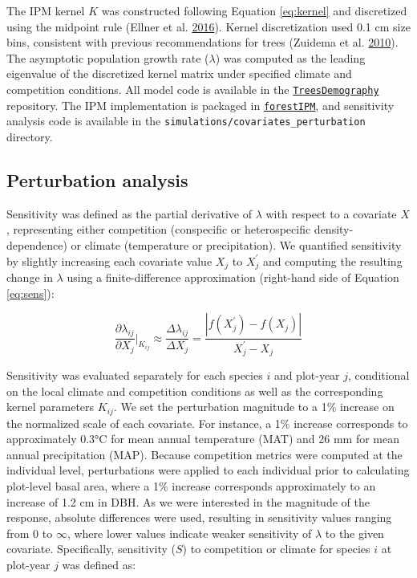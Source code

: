 \documentclass[12pt]{article}
\begin{document}
The IPM kernel \(K\) was constructed following Equation \ref{eq:kernel}
and discretized using the midpoint rule (Ellner et al.
\protect\hyperlink{ref-Ellner2016}{2016}). Kernel discretization used
0.1 cm size bins, consistent with previous recommendations for trees
(Zuidema et al. \protect\hyperlink{ref-zuidema2010integral}{2010}). The
asymptotic population growth rate (\(\lambda\)) was computed as the
leading eigenvalue of the discretized kernel matrix under specified
climate and competition conditions. All model code is available in the
\href{https://github.com/willvieira/TreesDemography}{\texttt{TreesDemography}}
repository. The IPM implementation is packaged in
\href{https://github.com/willvieira/forestIPM}{\texttt{forestIPM}}, and
sensitivity analysis code is available in the
\texttt{simulations/covariates\_perturbation} directory.

\hypertarget{perturbation-analysis}{%
\subsection{Perturbation analysis}\label{perturbation-analysis}}

Sensitivity was defined as the partial derivative of \(\lambda\) with
respect to a covariate \(X\), representing either competition
(conspecific or heterospecific density-dependence) or climate
(temperature or precipitation). We quantified sensitivity by slightly
increasing each covariate value \(X_j\) to \(X_j^{'}\) and computing the
resulting change in \(\lambda\) using a finite-difference approximation
(right-hand side of Equation \ref{eq:sens}):

\begin{equation}
\frac{\partial \lambda_{ij}}{\partial X_j} \bigg\rvert_{K_{ij}} \approx \frac{\Delta \lambda_{ij}}{\Delta X_j} = \frac{|f(X_j^{'}) - f(X_j)|}{X_j^{'} - X_j}
\label{eq:sens}\end{equation}

Sensitivity was evaluated separately for each species \(i\) and
plot-year \(j\), conditional on the local climate and competition
conditions as well as the corresponding kernel parameters \(K_{ij}\). We
set the perturbation magnitude to a 1\% increase on the normalized scale
of each covariate. For instance, a 1\% increase corresponds to
approximately 0.3°C for mean annual temperature (MAT) and 26 mm for mean
annual precipitation (MAP). Because competition metrics were computed at
the individual level, perturbations were applied to each individual
prior to calculating plot-level basal area, where a 1\% increase
corresponds approximately to an increase of 1.2 cm in DBH. As we were
interested in the magnitude of the response, absolute differences were
used, resulting in sensitivity values ranging from 0 to \(\infty\),
where lower values indicate weaker sensitivity of \(\lambda\) to the
given covariate. Specifically, sensitivity (\(S\)) to competition or
climate for species \(i\) at plot-year \(j\) was defined as:
\end{document}
